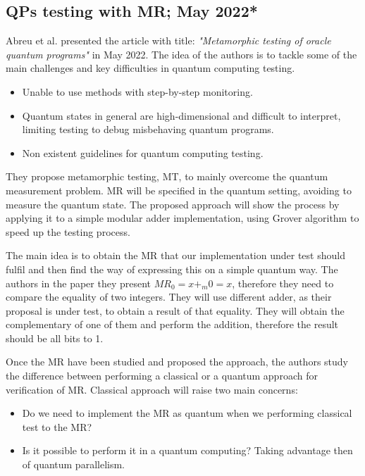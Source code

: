 \begin{itemize}
\vspace{15pt}
\subsection{QPs testing with MR; May 2022*}

Abreu et al. presented the article with title: \textit{"Metamorphic testing of oracle quantum programs"}\cite{abreu2022metamorphic} in May 2022. The idea of the authors is to tackle some of the main challenges and key difficulties in quantum computing testing. 
\begin{itemize}
    \item Unable to use methods with step-by-step monitoring.
    \item Quantum states in general are high-dimensional and difficult to interpret, limiting testing to debug misbehaving quantum programs.
    \item Non existent guidelines for quantum computing testing.
\end{itemize}

They propose metamorphic testing, MT, to mainly overcome the quantum measurement problem. MR will be specified in the quantum setting, avoiding to measure the quantum state. The proposed approach will show the process by applying it to a simple modular adder implementation, using Grover algorithm to speed up the testing process.\newline

The main idea is to obtain the MR that our implementation under test should fulfil and then find the way of expressing this on a simple quantum way. The authors in the paper they present $MR_0=x +_m 0 = x$, therefore they need to compare the equality of two integers. They will use different adder, as their proposal is under test, to obtain a result of that equality. They will obtain the complementary of one of them and perform the addition, therefore the result should be all bits to 1. \newline

Once the MR have been studied and proposed the approach, the authors study the difference between performing a classical or a quantum approach for verification of MR. Classical approach will raise two main concerns:
\begin{itemize}
    \item Do we need to implement the MR as quantum when we performing classical test to the MR?
    \item Is it possible to perform it in a quantum computing? Taking advantage then of quantum parallelism.
\end{itemize}


\end{itemize}
